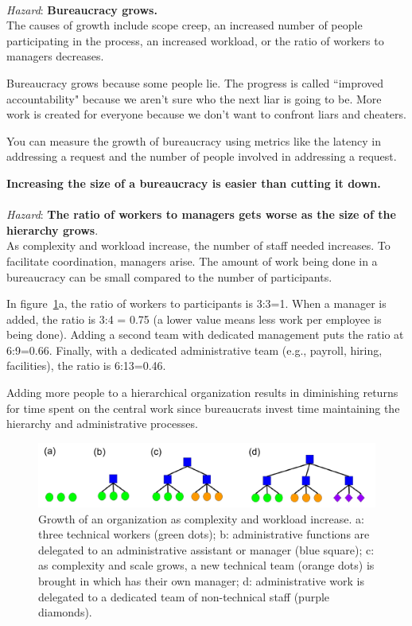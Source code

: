 \ \\
\textit{Hazard}: \textbf{Bureaucracy grows.}\\
The causes of growth include
scope creep, an increased number of people participating in the process, an increased workload, or the ratio of workers to managers decreases. 

Bureaucracy grows because some people lie. 
The progress is called ``improved accountability" because we aren't sure who the next liar is going to be.
More work is created for everyone because we don't want to confront  liars and cheaters. 


You can measure the growth of bureaucracy using metrics like the latency in addressing a request and the number of people involved in addressing a request.  

\textbf{Increasing the size of a bureaucracy is easier than cutting it down.}\\


\ \\
\textit{Hazard}: \textbf{The ratio of workers to managers gets worse as the size of the hierarchy grows}. \\
As complexity and workload increase, the number of staff needed increases. To facilitate coordination, managers arise. The amount of work being done in a bureaucracy can be small compared to the number of participants.

In figure~\ref{fig:growth_of_bureaucracy}a, the ratio of workers to participants is 3:3=1. When a manager is added, the ratio is 3:4 = 0.75 (a lower value means less work per employee is being done). Adding a second team with dedicated management puts the ratio at 6:9=0.66. Finally, with a dedicated administrative team (e.g., payroll, hiring, facilities), the ratio is 6:13=0.46.

Adding more people to a hierarchical organization results in diminishing returns for time spent on the central work since bureaucrats invest time maintaining the hierarchy and administrative processes.


    \begin{figure}
        \centering
        \includegraphics[width=1\textwidth]{images/growth-of-bureaucracy.pdf}
        \caption{Growth of an organization as complexity and workload increase. a: three technical workers (green dots); b: administrative functions are delegated to an administrative assistant or manager (blue square); c: as complexity and scale grows, a new technical team (orange dots) is brought in which has their own manager; d: administrative work is delegated to a dedicated team of non-technical staff (purple diamonds).}
        \label{fig:growth_of_bureaucracy}
    \end{figure}


